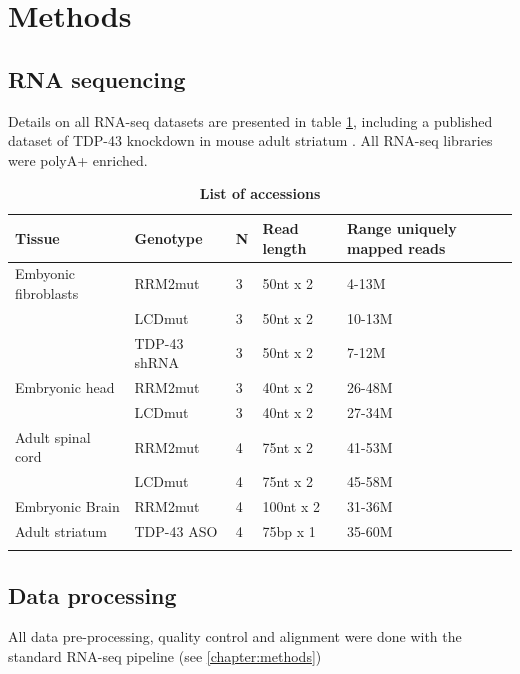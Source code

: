 \section{Methods}

\subsection{RNA sequencing}
Details on all RNA-seq datasets are presented in table \ref{table:tdp_mice_sequencing}, including a published dataset of TDP-43 knockdown in mouse adult striatum \citep{Polymenidou2011}. 
All RNA-seq libraries were polyA+ enriched. 

\begin{table}[h!]
	\caption[List of accessions]{\textbf{List of accessions}}
	\begin{footnotesize}
		\begin{tabular}{lllll}
			Tissue & Genotype & N &	Read length & Range uniquely mapped reads\\
			\hline	
			Embyonic fibroblasts & RRM2mut &3 &50nt	x 2 & 4-13M\\
			& LCDmut & 3 & 50nt	x	2 & 10-13M\\
			& TDP-43 shRNA & 3 & 50nt x 2 & 7-12M\\
			Embryonic head & RRM2mut & 3 & 40nt	x 2 & 26-48M\\
			& LCDmut & 3 & 40nt	x 2 & 27-34M \\
			Adult	spinal	cord & RRM2mut & 4 & 75nt x	2 & 41-53M\\
			& LCDmut & 4 & 75nt x 2 & 45-58M\\
			Embryonic	Brain	& RRM2mut & 4 & 100nt x 2 & 31-36M\\
			Adult striatum & TDP-43 ASO & 4 & 75bp x 1 & 35-60M\\
			\citep{Polymenidou2011-hs}
		\end{tabular}
	\end{footnotesize}
	\label{table:tdp_mice_sequencing}
\end{table}


\subsection{Data processing}

All data pre-processing, quality control and alignment were done with the standard RNA-seq pipeline (see \autoref{chapter:methods})




